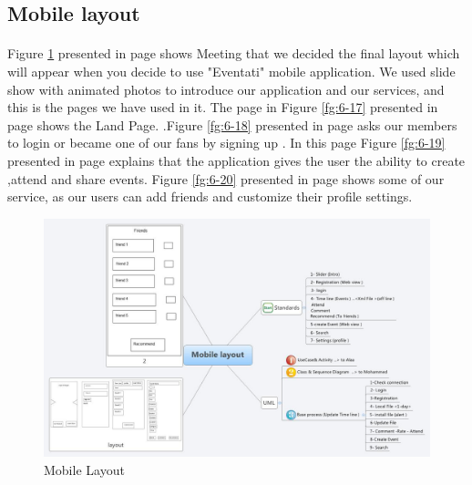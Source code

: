 \documentclass[12pt,a4paper,class,twoside,openany]{report}
\begin{document}
{\subsection{Mobile layout}
\paragraph*{\hspace{.9 cm} } Figure \ref{fg:6-16} presented in page \pageref{fg:6-16} shows Meeting that we decided the final layout which will appear when you decide to use "Eventati" mobile application. We used slide show with animated photos to introduce our application and our services, and this is the pages we have used in it. The page in Figure \ref{fg:6-17} presented in page \pageref{fg:6-17} shows  the Land Page. .Figure \ref{fg:6-18} presented in page \pageref{fg:6-18} asks our members to login or became one of our fans by signing up . In this page Figure \ref{fg:6-19} presented in page \pageref{fg:6-19} explains that the application gives the user the ability to create ,attend and share events. Figure \ref{fg:6-20} presented in page \pageref{fg:6-20} shows some of our service, as our users can add friends and customize their profile settings.
\begin{figure}
\begin{center}
\includegraphics[height=4 in,angle=90,width=\textwidth]{6-16}
\caption{Mobile Layout}
\label{fg:6-16}
\end{center}
\end{figure}
 \begin{figure}
	\begin{minipage}[b]{0.5\linewidth}

\end{minipage}
\end{figure}}
\end{document}
